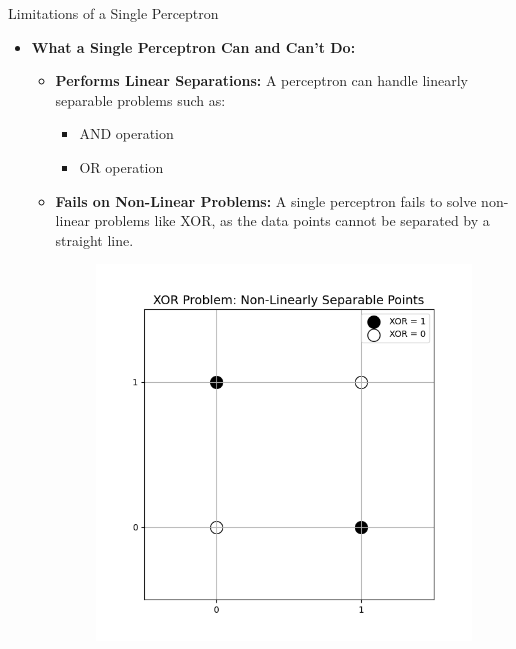 \documentclass[serif, aspectratio=169]{beamer}
\begin{document}
\begin{frame}{Limitations of a Single Perceptron}
    \begin{itemize}
        \item \textbf{What a Single Perceptron Can and Can't Do:}
        \medskip
        \begin{itemize}\itemsep1em
            \item \justifying \textbf{Performs Linear Separations:}
            A perceptron can handle linearly separable problems such as:
            \begin{itemize}
                \item AND operation
                \item OR operation
            \end{itemize}
            \item \justifying \textbf{Fails on Non-Linear Problems:}
            A single perceptron fails to solve non-linear problems like XOR, as the data points cannot be separated by a straight line.
            \endminipage
            \hfill
            \begin{figure}
                \centering
                \includegraphics[width=\linewidth]{pic/Figure_23.png}
            \end{figure}
            \endminipage
        \end{itemize}
    \end{itemize}
\end{frame}
\end{document}
